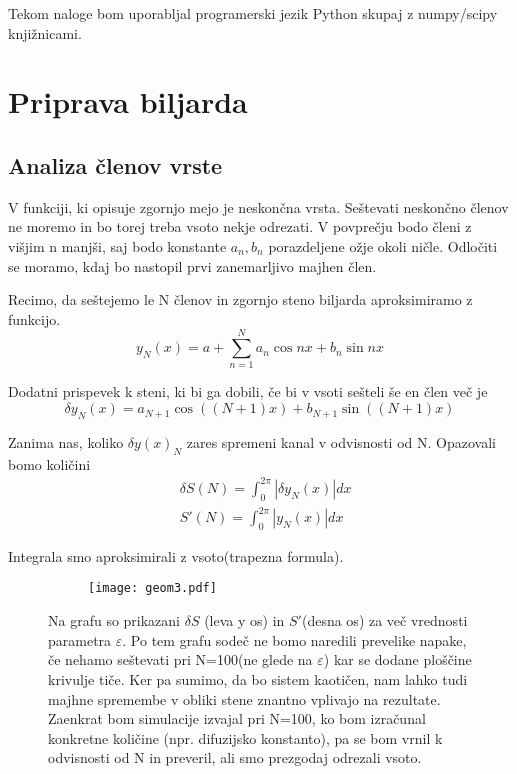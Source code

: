 \documentclass{article}
\begin{document}
Tekom naloge bom uporabljal programerski jezik Python skupaj z numpy/scipy knjižnicami.
\section{Priprava biljarda}
\subsection{Analiza členov vrste}
V funkciji, ki opisuje zgornjo mejo je neskončna vrsta. Seštevati neskončno členov ne moremo in bo torej treba vsoto nekje odrezati. V povprečju bodo členi z višjim n manjši, saj bodo konstante $a_n, b_n$ porazdeljene ožje okoli ničle. Odločiti se moramo, kdaj bo nastopil prvi zanemarljivo majhen člen.

Recimo, da seštejemo le N členov in zgornjo steno biljarda aproksimiramo z funkcijo.
\begin{equation*}
y_N(x) = a + \sum_{n=1}^N a_n \cos nx + b_n \sin nx
\end{equation*}

Dodatni prispevek k steni, ki bi ga dobili, če bi v vsoti sešteli še en člen več je 
\begin{equation*}
\delta y_N(x) = a_{N+1} \cos((N+1)x) + b_{N+1} \sin((N+1)x)
\end{equation*}

Zanima nas, koliko $\delta y(x)_N$ zares spremeni kanal v odvisnosti od N. Opazovali bomo količini
\begin{align*}
&\delta S(N) = \int_0^{2\pi} |\delta y_N(x)| dx \\
&S'(N) = \int_0^{2\pi} |y_N(x)| dx 
\end{align*}

Integrala smo aproksimirali z vsoto(trapezna formula). 
\begin{figure}[H]
\centering
\begin{subfigure}{\textwidth}
\texttt{[image: geom3.pdf]}
\end{subfigure}
\caption*{Na grafu so prikazani $\delta S$ (leva y os) in $S'$(desna os) za več vrednosti parametra $\varepsilon$. Po tem grafu sodeč ne bomo naredili prevelike napake, če nehamo seštevati pri N=100(ne glede na $\varepsilon$) kar se dodane ploščine krivulje tiče. Ker pa sumimo, da bo sistem kaotičen, nam lahko tudi majhne spremembe v obliki stene znantno vplivajo na rezultate. Zaenkrat bom simulacije izvajal pri N=100, ko bom izračunal konkretne količine (npr. difuzijsko konstanto), pa se bom vrnil k odvisnosti od N in preveril, ali smo prezgodaj odrezali vsoto.}
\end{figure}
\end{document}
